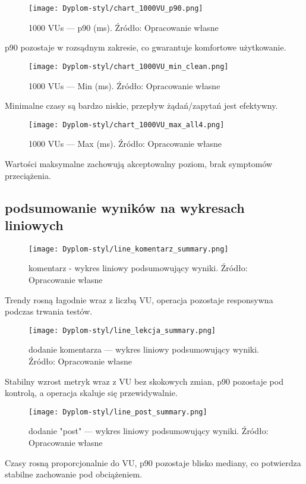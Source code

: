 \begin{figure}[H]\centering
\texttt{[image: Dyplom-styl/chart\_1000VU\_p90.png]}
\caption{1000 VUs --- p90 (ms). Źródło: Opracowanie własne}\label{fig:1000-p90}
\end{figure}
p90 pozostaje w rozsądnym zakresie, co gwarantuje komfortowe użytkowanie.

\begin{figure}[H]\centering
\texttt{[image: Dyplom-styl/chart\_1000VU\_min\_clean.png]}
\caption{1000 VUs --- Min (ms). Źródło: Opracowanie własne}\label{fig:1000-min}
\end{figure}
Minimalne czasy są bardzo niskie, przepływ żądań/zapytań jest efektywny.

\begin{figure}[H]\centering
\texttt{[image: Dyplom-styl/chart\_1000VU\_max\_all4.png]}
\caption{1000 VUs --- Max (ms). Źródło: Opracowanie własne}\label{fig:1000-max}
\end{figure}
Wartości maksymalne zachowują akceptowalny poziom, brak symptomów przeciążenia.
\subsection{podsumowanie wyników na wykresach liniowych}

\begin{figure}[H]\centering
\texttt{[image: Dyplom-styl/line\_komentarz\_summary.png]}
\caption{komentarz - wykres liniowy podsumowujący wyniki. Źródło: Opracowanie własne}\label{fig:line-post-summary}
\end{figure}
Trendy rosną łagodnie wraz z liczbą VU, operacja pozostaje responsywna podczas trwania testów.

\begin{figure}[H]\centering
\texttt{[image: Dyplom-styl/line\_lekcja\_summary.png]}
\caption{dodanie komentarza — wykres liniowy podsumowujący wyniki. Źródło: Opracowanie własne}\label{fig:line-komentarz-summary}
\end{figure}
Stabilny wzrost metryk wraz z VU bez skokowych zmian, p90 pozostaje pod kontrolą, a operacja skaluje się przewidywalnie.

\begin{figure}[H]\centering
\texttt{[image: Dyplom-styl/line\_post\_summary.png]}
\caption{dodanie "post" — wykres liniowy podsumowujący wyniki. Źródło: Opracowanie własne}\label{fig:line-post-summary}
\end{figure}
Czasy rosną proporcjonalnie do VU, p90 pozostaje blisko mediany, co potwierdza stabilne zachowanie pod obciążeniem.

